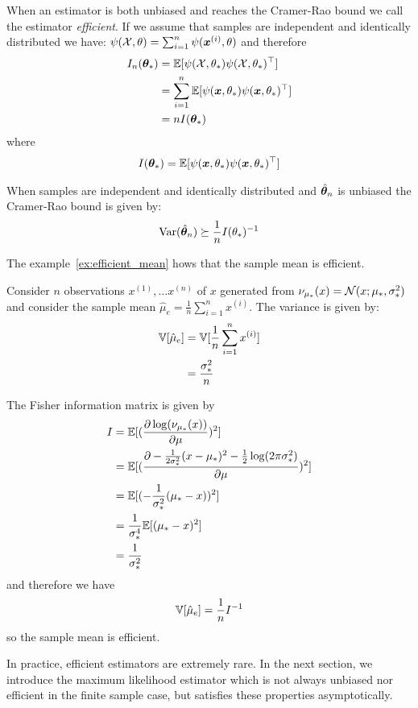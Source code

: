 When an estimator is both unbiased and reaches the Cramer-Rao bound we call the
estimator \emph{efficient}.
If we assume that samples are independent and identically distributed we
have: $\psi(\mathcal{X}, \theta) = \sum_{i=1}^n \psi(\boldsymbol{x}^{(i)}, \theta)$ and therefore
\begin{align}
  I_n(\boldsymbol{\theta}_*) &= \mathbb{E}[\psi(\mathcal{X}, \theta_*) \psi(\mathcal{X}, \theta_*)^{\top}] \\
               &= \sum_{i=1}^n \mathbb{E}[\psi(\boldsymbol{x}, \theta_*) \psi(\boldsymbol{x}, \theta_*)^{\top}] \\
               &= n I(\boldsymbol{\theta}_*)
\end{align}
where
\begin{align}
  I(\boldsymbol{\theta}_*) = \mathbb{E}[\psi(\boldsymbol{x}, \theta_*) \psi(\boldsymbol{x}, \theta_*)^{\top}]
\end{align}

When samples are independent and identically distributed and $\hat{\boldsymbol{\theta}}_n$ is unbiased the Cramer-Rao
bound is given by:
\begin{equation}
  \operatorname*{Var}(\hat{\boldsymbol{\theta}}_n) \succeq \frac1{n} I(\theta_*)^{-1}
\end{equation}

The example~\ref{ex:efficient_mean} hows that the sample mean
is efficient.
\begin{example}
  \label{ex:efficient_mean}
  Consider $n$ observations $x^{(1)},
  \dots x^{(n)}$ of $x$ generated from $\nu_{\mu_*}(x) = \mathcal{N}(x; \mu_*, \sigma_*^2)$
  and consider the sample mean $\hat{\mu}_e = \frac1{n} \sum_{i=1}^n x^{(i)}$.
  The variance is given by:
  \begin{align}
    \mathbb{V}[\hat{\mu}_e] &= \mathbb{V}[\frac1{n} \sum_{i=1}^n x^{(i)}] \\
    &= \frac{\sigma_*^2}{n}
  \end{align}

  The Fisher information matrix is given by
  \begin{align}
    I &= \mathbb{E}[(\frac{ \partial \log(\nu_{\mu_*}(x))}{\partial \mu})^2] \\
      &= \mathbb{E}[(\frac{ \partial -\frac1{2 \sigma_*^2} (x - \mu_*)^2 - \frac12\log(2\pi \sigma_*^2)}{\partial \mu})^2] \\
      &= \mathbb{E}[(-\frac1{\sigma_*^2} (\mu_* - x))^2] \\
      &= \frac1{\sigma_*^4}\mathbb{E} [(\mu_* - x)^2] \\
      &= \frac1{\sigma_*^2}
  \end{align}
  and therefore we have
  \begin{equation}
  \mathbb{V}[\hat{\mu}_e]  = \frac1{n} I^{-1}
  \end{equation}
  so the sample mean is efficient.
\end{example}
In practice, efficient estimators are extremely rare. In the next section, we
introduce the maximum likelihood estimator which is not always unbiased nor
efficient in the finite sample case, but satisfies these properties asymptotically.

